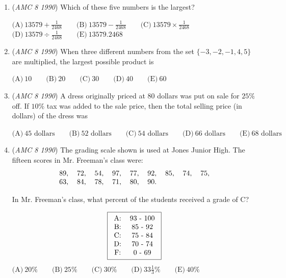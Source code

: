 \begin{enumerate}
 $\text{(A)}\ 0.011 \qquad \text{(B)}\ 0.110 \qquad \text{(C)}\ 1.10 \qquad \text{(D)}\ 11.0 \qquad \text{(E)}\ 110$


	\item (\textit{AMC 8 1990}) Which of these five numbers is the largest?


 $\text{(A)}\ 13579+\frac{1}{2468} \qquad \text{(B)}\ 13579-\frac{1}{2468} \qquad \text{(C)}\ 13579\times \frac{1}{2468}$
$\text{(D)}\ 13579\div \frac{1}{2468} \qquad \text{(E)}\ 13579.2468$


	\item (\textit{AMC 8 1990}) When three different numbers from the set $\{ -3, -2, -1, 4, 5 \}$ are multiplied, the largest possible product is 


 $\text{(A)}\ 10 \qquad \text{(B)}\ 20 \qquad \text{(C)}\ 30 \qquad \text{(D)}\ 40 \qquad \text{(E)}\ 60$


	\item (\textit{AMC 8 1990}) A dress originally priced at $80$ dollars was put on sale for $25\%$ off.  If $10\%$ tax was added to the sale price, then the total selling price (in dollars) of the dress was


 $\text{(A)}\ \text{45 dollars} \qquad \text{(B)}\ \text{52 dollars} \qquad \text{(C)}\ \text{54 dollars} \qquad \text{(D)}\ \text{66 dollars} \qquad \text{(E)}\ \text{68 dollars}$


	\item (\textit{AMC 8 1990}) The grading scale shown is used at Jones Junior High.  The fifteen scores in Mr. Freeman's class were: 
 \[\begin{tabular}[t]{lllllllll} 89, & 72, & 54, & 97, & 77, & 92, & 85, & 74, & 75, \\ 63, & 84, & 78, & 71, & 80, & 90. & & & \\ \end{tabular}\]


 In Mr. Freeman's class, what percent of the students received a grade of C?


 
 \[\boxed{\begin{tabular}[t]{cc} A: & 93 - 100 \\ B: & 85 - 92 \\ C: & 75 - 84 \\ D: & 70 - 74 \\ F: & 0 - 69  \end{tabular}}\]
$\text{(A)}\ 20\% \qquad \text{(B)}\ 25\% \qquad \text{(C)}\ 30\% \qquad \text{(D)}\ 33\frac{1}{3}\% \qquad \text{(E)}\ 40\%$



\end{enumerate}
